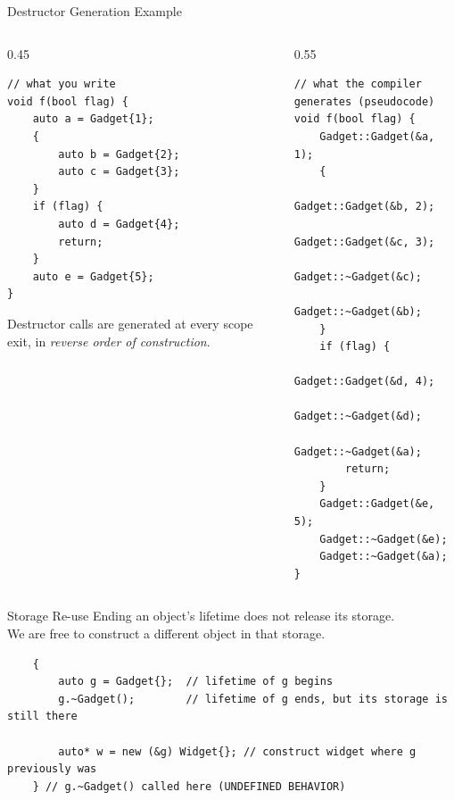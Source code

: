 \begin{frame}[fragile]{Destructor Generation Example}
  \begin{columns}[T]
    \begin{column}{0.45\textwidth}
      \begin{verbatim}
// what you write
void f(bool flag) {
    auto a = Gadget{1};
    {
        auto b = Gadget{2};
        auto c = Gadget{3};
    }
    if (flag) {
        auto d = Gadget{4};
        return;
    }
    auto e = Gadget{5};
}
      \end{verbatim}

      Destructor calls are generated at every scope exit, in \emph{reverse order of construction}.
    \end{column}
    \begin{column}{0.55\textwidth}
      \begin{verbatim}
// what the compiler generates (pseudocode)
void f(bool flag) {
    Gadget::Gadget(&a, 1);
    {
        Gadget::Gadget(&b, 2);
        Gadget::Gadget(&c, 3);
        Gadget::~Gadget(&c);
        Gadget::~Gadget(&b);
    }
    if (flag) {
        Gadget::Gadget(&d, 4);
        Gadget::~Gadget(&d);
        Gadget::~Gadget(&a);
        return;
    }
    Gadget::Gadget(&e, 5);
    Gadget::~Gadget(&e);
    Gadget::~Gadget(&a);
}
      \end{verbatim}
    \end{column}
  \end{columns}
\end{frame}

\begin{frame}[fragile]{Storage Re-use}
  Ending an object's lifetime does not release its storage.\\
  We are free to construct a different object in that storage.

  \begin{verbatim}
    {
        auto g = Gadget{};  // lifetime of g begins
        g.~Gadget();        // lifetime of g ends, but its storage is still there

        auto* w = new (&g) Widget{}; // construct widget where g previously was
    } // g.~Gadget() called here (UNDEFINED BEHAVIOR)
  \end{verbatim}
\end{frame}

